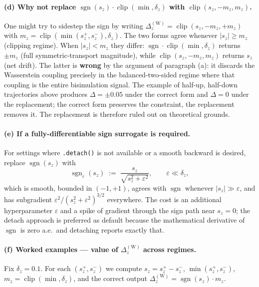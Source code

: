 \documentclass{article}
\DeclareMathOperator*{\clip}{clip}
\begin{document}
\paragraph{(d) Why not replace $\operatorname{sgn}(s_z)\cdot\clip(\min,\delta_z)$ with $\clip(s_z,-m_z,m_z)$.}
One might try to sidestep the sign by writing
$\Delta_z^{(\text{W})} = \clip(s_z,-m_z,+m_z)$ with
$m_z = \clip(\min(s_z^+,s_z^-),\delta_z)$. The two forms agree whenever
$|s_z|\geq m_z$ (clipping regime). When $|s_z|<m_z$ they differ:
$\operatorname{sgn}\cdot\clip(\min,\delta_z)$ returns $\pm m_z$ (full
symmetric-transport magnitude), while $\clip(s_z,-m_z,m_z)$ returns
$s_z$ (net drift). The latter is \textbf{wrong} by the argument of
paragraph (a): it discards the Wasserstein coupling precisely in the
balanced-two-sided regime where that coupling is the entire
bisimulation signal. The example of half-up, half-down trajectories
above produces $\Delta=\pm 0.05$ under the correct form and
$\Delta=0$ under the replacement; the correct form preserves the
constraint, the replacement removes it. The replacement is therefore
ruled out on theoretical grounds.

\paragraph{(e) If a fully-differentiable sign surrogate is required.}
For settings where \verb|.detach()| is not available or a smooth
backward is desired, replace $\operatorname{sgn}(s_z)$ with
\[
\operatorname{sgn}_\varepsilon(s_z) \;:=\; \frac{s_z}{\sqrt{s_z^2+\varepsilon^2}},
\qquad \varepsilon\ll\delta_z,
\]
which is smooth, bounded in $(-1,+1)$, agrees with $\operatorname{sgn}$
whenever $|s_z|\gg\varepsilon$, and has subgradient
$\varepsilon^2/(s_z^2+\varepsilon^2)^{3/2}$ everywhere. The cost is an
additional hyperparameter $\varepsilon$ and a spike of gradient through
the sign path near $s_z=0$; the detach approach is preferred as default
because the mathematical derivative of $\operatorname{sgn}$ is zero
a.e.\ and detaching reports exactly that.

\paragraph{(f) Worked examples --- value of $\Delta_z^{(\text{W})}$ across regimes.}
Fix $\delta_z = 0.1$. For each $(s_z^+, s_z^-)$ we compute
$s_z = s_z^+-s_z^-$, $\min(s_z^+,s_z^-)$, $m_z = \clip(\min,\delta_z)$,
and the correct output $\Delta_z^{(\text{W})} = \operatorname{sgn}(s_z)\cdot m_z$.
\end{document}
